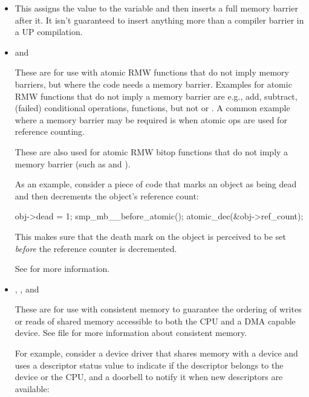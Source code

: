 \begin{itemize}
 \item {}

     This assigns the value to the variable and then inserts a full memory
     barrier after it.  It isn't guaranteed to insert anything more than a
     compiler barrier in a UP compilation.


 \item {} and 

     These are for use with atomic RMW functions that do not imply memory
     barriers, but where the code needs a memory barrier.
     Examples for atomic RMW functions that do not imply a memory barrier
     are e.g., add, subtract, (failed) conditional operations,
      functions, but not  or .
     A common example where a memory barrier may be required is when
     atomic ops are used for reference counting.

     These are also used for atomic RMW bitop functions that do not imply a
     memory barrier (such as  and ).

     As an example, consider a piece of code that marks an object as being dead
     and then decrements the object's reference count:

\begin{VerbatimU}
	obj->dead = 1;
	smp_mb__before_atomic();
	atomic_dec(&obj->ref_count);
\end{VerbatimU}

     This makes sure that the death mark on the object is perceived to be set
     \emph{before} the reference counter is decremented.

     See  for more information.

   \item {}, , and 

     These are for use with consistent memory to guarantee the ordering
     of writes or reads of shared memory accessible to both the CPU and a
     DMA capable device.
     See  file for more
     information about consistent memory.

     For example, consider a device driver that shares memory with a device
     and uses a descriptor status value to indicate if the descriptor belongs
     to the device or the CPU, and a doorbell to notify it when new
     descriptors are available:


\end{itemize}
